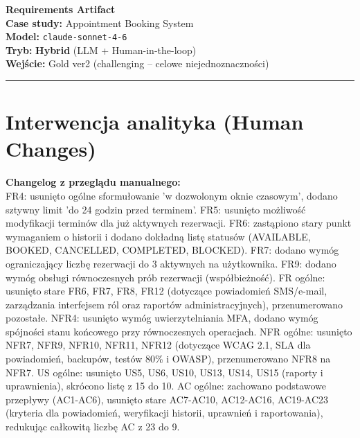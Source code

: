 \documentclass[12pt,a4paper]{article}
\begin{document}
\begin{center}
  {\LARGE\bfseries Requirements Artifact}\\[1.5em]
  {\large \textbf{Case study:} Appointment Booking System}\\[0.3em]
  {\large \textbf{Model:} \texttt{claude-sonnet-4-6}}\\[0.3em]
  {\large \textbf{Tryb:} \textbf{Hybrid} (LLM + Human-in-the-loop)}\\[0.3em]
  {\large \textbf{Wejście:} Gold ver2 (challenging -- celowe niejednoznaczności)}
\end{center}

\vspace{1em}\hrule\vspace{1.5em}

\section{Interwencja analityka (Human Changes)}

\begin{mdframed}[backgroundcolor=promptbg, linewidth=0pt, innerleftmargin=10pt, innerrightmargin=10pt, innertopmargin=8pt, innerbottommargin=8pt]
\small
\textbf{Changelog z przeglądu manualnego:}\\
FR4: usunięto ogólne sformułowanie 'w dozwolonym oknie czasowym', dodano sztywny limit 'do 24 godzin przed terminem'. 
FR5: usunięto możliwość modyfikacji terminów dla już aktywnych rezerwacji. 
FR6: zastąpiono stary punkt wymaganiem o historii i dodano dokładną listę statusów (AVAILABLE, BOOKED, CANCELLED, COMPLETED, BLOCKED). 
FR7: dodano wymóg ograniczający liczbę rezerwacji do 3 aktywnych na użytkownika. 
FR9: dodano wymóg obsługi równoczesnych prób rezerwacji (współbieżność). 
FR ogólne: usunięto stare FR6, FR7, FR8, FR12 (dotyczące powiadomień SMS/e-mail, zarządzania interfejsem ról oraz raportów administracyjnych), przenumerowano pozostałe. 
NFR4: usunięto wymóg uwierzytelniania MFA, dodano wymóg spójności stanu końcowego przy równoczesnych operacjach. 
NFR ogólne: usunięto NFR7, NFR9, NFR10, NFR11, NFR12 (dotyczące WCAG 2.1, SLA dla powiadomień, backupów, testów 80\% i OWASP), przenumerowano NFR8 na NFR7. 
US ogólne: usunięto US5, US6, US10, US13, US14, US15 (raporty i uprawnienia), skrócono listę z 15 do 10. 
AC ogólne: zachowano podstawowe przepływy (AC1-AC6), usunięto stare AC7-AC10, AC12-AC16, AC19-AC23 (kryteria dla powiadomień, weryfikacji historii, uprawnień i raportowania), redukując całkowitą liczbę AC z 23 do 9.
\end{mdframed}
\end{document}
